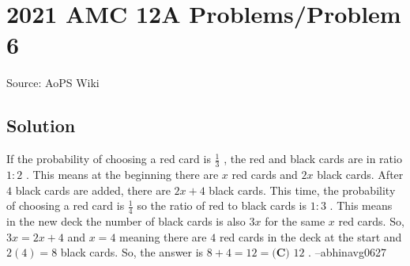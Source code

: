 \documentclass[12pt]{article}
\begin{document}
\section*{{2021 AMC 12A Problems/Problem 6}}
Source: AoPS Wiki

\subsection*{Solution}
If the probability of choosing a red card is $\frac{1}{3}$ , the red and black cards are in ratio $1:2$ . This means at the beginning there are $x$ red cards and $2x$ black cards. After $4$ black cards are added, there are $2x+4$ black cards. This time, the probability of choosing a red card is $\frac{1}{4}$ so the ratio of red to black cards is $1:3$ . This means in the new deck the number of black cards is also $3x$ for the same $x$ red cards. So, $3x = 2x + 4$ and $x=4$ meaning there are $4$ red cards in the deck at the start and $2(4) = 8$ black cards. So, the answer is $8+4 = 12 = \boxed{\textbf{(C) }12}$ . --abhinavg0627
\end{document}
